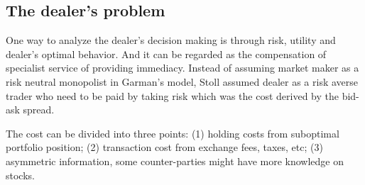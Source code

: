 \documentclass[a4]{article}
\begin{document}
\subsection{The dealer's problem}
One way to analyze the dealer's decision making is through risk, utility and dealer's optimal behavior. And it can be regarded as the compensation of specialist service of providing immediacy. Instead of assuming market maker as a risk neutral monopolist in Garman's model, Stoll assumed dealer as a risk averse trader who need to be paid by taking risk which was the cost derived by the bid-ask spread.\par 
The cost can be divided into three points: (1) holding costs from suboptimal portfolio position; (2) transaction cost from exchange fees, taxes, etc; (3) asymmetric information, some counter-parties might have more knowledge on stocks.\par 
\end{document}
